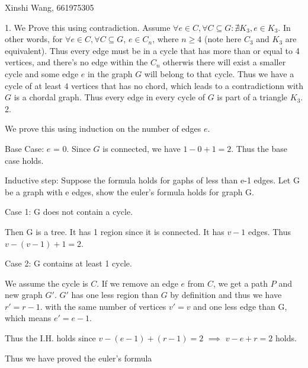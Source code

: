 \documentclass[12pt]{article}
\begin{document}
	Xinshi Wang, 661975305
	
	1. We Prove this using contradiction. Assume $\forall e \in C, \forall C \subseteq G : \nexists K_3, e \in K_3$. In other words, for $\forall e \in C, \forall C \subseteq G$, $e \in C_n$, where $n \geq 4$ (note here $C_3$ and $K_3$ are equivalent). Thus every edge must be in a cycle that has more than or equal to 4 vertices, and there's no edge within the $C_n$ otherwis there will exist a smaller cycle and some edge $e$ in the graph $G$ will belong to that cycle. Thus we have a cycle of at least $4$ vertices that has no chord, which leads to a contradictionn with $G$ is a chordal graph. Thus every edge in every cycle of $G$ is part of a triangle $K_3$.\\
	
	2.
	
	 We prove this using induction on the number of edges $e$.
	
	Base Case: $e$ = 0. Since $G$ is connected, we have $1-0+1 = 2$. Thus the base case holds.
	
	Inductive step: Suppose the formula holds for gaphs of less than e-1 edges. Let G be a graph with e edges, show the euler's formula holds for graph G.
	
	Case 1: G does not contain a cycle. 
	
	Then G is a tree. It has 1 region since it is connected. It has $v-1$ edges. Thus $v-(v-1)+1 = 2$.
	
	Case 2: G contains at least 1 cycle.
	
	We assume the cycle is $C$. If we remove an edge $e$ from $C$, we get a path $P$ and new graph $G'$. $G'$ has one less region than $G$ by definition and thus we have $r' = r-1$.  with the same number of vertices $v' = v$ and one less edge than G, which means $e' = e-1$.
	
	Thus the I.H. holds since $v-(e-1)+(r-1) = 2$ $\implies$ $v-e+r = 2$ holds.

	Thus we have proved the euler's formula 
\end{document}
